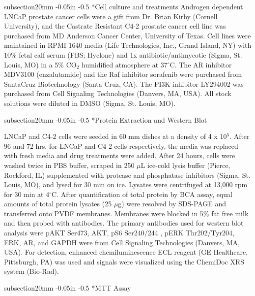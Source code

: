 \documentclass[12pt]{article}
\makeatletter
\renewcommand\subsection{\@startsection
	{subsection}{2}{0mm}
	{-0.05in}
	{-0.5\baselineskip}
	{\normalfont\normalsize\bfseries}}
\makeatother
\begin{document}
\subsection*{Cell culture and treatments}
Androgen dependent LNCaP prostate cancer cells were a gift from Dr. Brian Kirby (Cornell University), and the Castrate Resistant C4-2 prostate cancer cell line was purchased from MD Anderson Cancer Center, University of Texas. Cell lines were maintained in RPMI 1640 media (Life Technologies, Inc., Grand Island, NY) with 10\% fetal calf serum (FBS; Hyclone) and 1x antibiotic/antimycotic (Sigma, St. Louis, MO) in a 5\% CO$_2$ humidified atmosphere at 37$^{\circ}$C. The AR inhibitor MDV3100 (enzalutamide) and the Raf inhibitor sorafenib were purchased from SantaCruz Biotechnology (Santa Cruz, CA). The PI3K inhibitor LY294002 was purchased from Cell Signaling Technologies (Danvers, MA, USA). All stock solutions were diluted in DMSO (Sigma, St. Louis, MO). 

\subsection*{Protein Extraction and Western Blot}

LNCaP and C4-2 cells were seeded in 60 mm dishes at a density of 4 x 10$^{5}$. After 96 and 72 hrs, for LNCaP and C4-2 cells respectively, the media was replaced with fresh media and drug treatments were added. After 24 hours, cells were washed twice in PBS buffer, scraped in 250 $\mu$L ice-cold lysis buffer (Pierce, Rockford, IL) supplemented with protease and phosphatase inhibitors (Sigma, St. Louis, MO), and lysed for 30 min on ice. Lysates were centrifuged at 13,000 rpm for 30 min at 4$^{\circ}$C. After quantification of total protein by BCA assay, equal amounts of total protein lysates (25 $\mu$g) were resolved by SDS-PAGE and transferred onto PVDF membranes. Membranes were blocked in 5\% fat free milk and then probed with antibodies. The primary antibodies used for western blot analysis were pAKT Ser473, AKT, pS6 Ser240/244 , pERK Thr202/Tyr204, ERK, AR, and GAPDH were from Cell Signaling Technologies (Danvers, MA, USA). For detection, enhanced chemiluminescence ECL reagent (GE Healthcare, Pittsburgh, PA) was used and signals were visualized using the ChemiDoc XRS system (Bio-Rad). 

\subsection*{MTT Assay}
\end{document}

